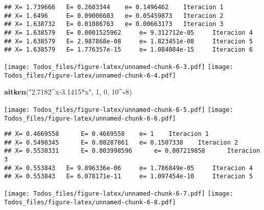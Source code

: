 \documentclass[]{article}
\newenvironment{Shaded}{\begin{snugshade}}{\end{snugshade}}
\newcommand{\DecValTok}[1]{\textcolor[rgb]{0.00,0.00,0.81}{#1}}
\newcommand{\KeywordTok}[1]{\textcolor[rgb]{0.13,0.29,0.53}{\textbf{#1}}}
\newcommand{\NormalTok}[1]{#1}
\newcommand{\OperatorTok}[1]{\textcolor[rgb]{0.81,0.36,0.00}{\textbf{#1}}}
\newcommand{\StringTok}[1]{\textcolor[rgb]{0.31,0.60,0.02}{#1}}
\begin{document}
\begin{verbatim}
## X= 1.739666   E= 0.2603344    e= 0.1496462    Iteracion 1 
## X= 1.6496     E= 0.09006603   e= 0.05459873   Iteracion 2 
## X= 1.638732   E= 0.01086763   e= 0.00663173   Iteracion 3 
## X= 1.638579   E= 0.0001525962     e= 9.312712e-05     Iteracion 4 
## X= 1.638579   E= 2.987868e-08     e= 1.823451e-08     Iteracion 5 
## X= 1.638579   E= 1.776357e-15     e= 1.084084e-15     Iteracion 6
\end{verbatim}

\texttt{[image: Todos\_files/figure-latex/unnamed-chunk-6-3.pdf]}
\texttt{[image: Todos\_files/figure-latex/unnamed-chunk-6-4.pdf]}

\begin{Shaded}
\begin{Highlighting}[]
\KeywordTok{aitken}\NormalTok{(}\StringTok{"2.7182^x-3.1415*x"}\NormalTok{, }\DecValTok{1}\NormalTok{, }\DecValTok{0}\NormalTok{, }\DecValTok{10}\OperatorTok{^-}\DecValTok{8}\NormalTok{)}
\end{Highlighting}
\end{Shaded}

\texttt{[image: Todos\_files/figure-latex/unnamed-chunk-6-5.pdf]}
\texttt{[image: Todos\_files/figure-latex/unnamed-chunk-6-6.pdf]}

\begin{verbatim}
## X= 0.4669558      E= 0.4669558    e= 1    Iteracion 1 
## X= 0.5498345      E= 0.08287861   e= 0.1507338    Iteracion 2 
## X= 0.5538331      E= 0.003998596      e= 0.007219858      Iteracion 3 
## X= 0.553843   E= 9.896336e-06     e= 1.786849e-05     Iteracion 4 
## X= 0.553843   E= 6.078171e-11     e= 1.097454e-10     Iteracion 5
\end{verbatim}

\texttt{[image: Todos\_files/figure-latex/unnamed-chunk-6-7.pdf]}
\texttt{[image: Todos\_files/figure-latex/unnamed-chunk-6-8.pdf]}
\end{document}
